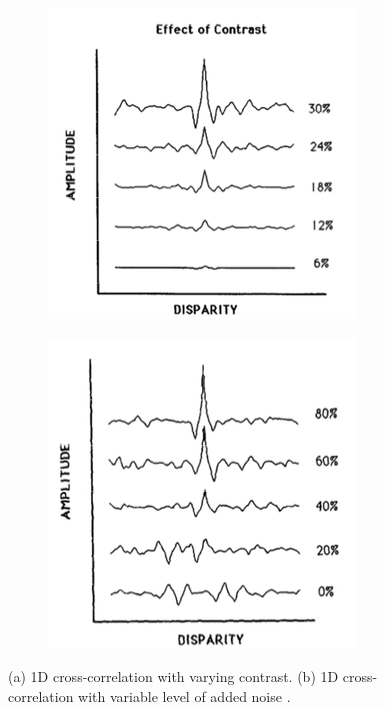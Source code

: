 \begin{figure}[htbp]
    \begin{subfigure}[b]{0.5\textwidth}
        \includegraphics[width=\textwidth]{./Template_Figures/cormack_cont}
        \caption{}\label{fig:cormack_cont}
    \end{subfigure}
    \begin{subfigure}[b]{0.5\textwidth}
        \includegraphics[width=\textwidth]{./Template_Figures/cormack_noise}
        \caption{}\label{fig:cormack_noise}
    \end{subfigure}
    \caption{(a) 1D cross-correlation with varying contrast. (b) 1D cross-correlation with variable level of added noise \cite{cormack1991interocular}.\label{fig:cormack}}
\end{figure}

